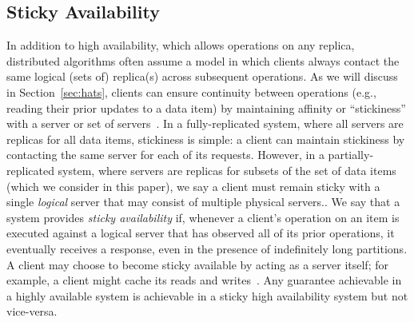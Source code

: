 \subsection{Sticky Availability}

In addition to high availability, which allows operations on any
replica, distributed algorithms often assume a model in which clients
always contact the same logical (sets of) replica(s) across subsequent
operations. As we will discuss in Section~\ref{sec:hats}, clients can
ensure continuity between operations (e.g., reading their prior
updates to a data item) by maintaining affinity or ``stickiness'' with
a server or set of servers~\cite{vogels-defs}. In a fully-replicated
system, where all servers are replicas for all data items, stickiness
is simple: a client can maintain stickiness by contacting the same
server for each of its requests. However, in a partially-replicated
system, where servers are replicas for subsets of the set of data
items (which we consider in this paper), we say a client must remain
sticky with a single \textit{logical} server that may consist of
multiple physical servers.. We say that a system provides
\textit{sticky availability} if, whenever a client's operation on an
item is executed against a logical server that has observed all of its
prior operations, it eventually receives a response, even in the
presence of indefinitely long partitions. A client may choose to
become sticky available by acting as a server itself; for example, a
client might cache its reads and writes~\cite{bolton,
  sessionguarantees, swift}. Any guarantee achievable in a highly
available system is achievable in a sticky high availability system
but not vice-versa.


